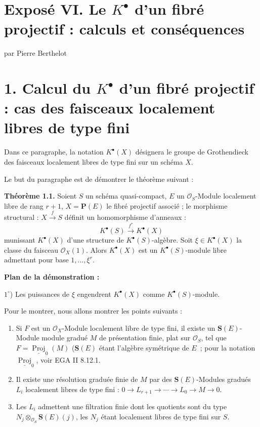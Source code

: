 \section*{Exposé VI. Le \(K^{\bullet}\) d'un fibré projectif : calculs et conséquences}
\renewcommand{\Sym}{\mathbf{S}}
\renewcommand{\Projz}{\underline{\operatorname{Proj}}_0}
\begin{center}
par Pierre Berthelot
\end{center}

\section*{1. Calcul du \(K^{\bullet}\) d'un fibré projectif : cas des faisceaux localement libres de type fini}

Dans ce paragraphe, la notation \(K^{\bullet}(X)\) désignera le groupe de Grothendieck des faisceaux localement libres de type fini sur un schéma \(X\).

Le but du paragraphe est de démontrer le théorème suivant :

\textbf{Théorème 1.1.} Soient \(S\) un schéma quasi-compact, \(E\) un \(\mathcal O_S\)-Module localement libre de rang \(r+1\), \(X=\mathbf P(E)\) le fibré projectif associé ; le morphisme structural : \(X\xrightarrow{f}S\) définit un homomorphisme d'anneaux :
\[
  K^{\bullet}(S) \xrightarrow{f^*} K^{\bullet}(X)
\]
munissant \(K^{\bullet}(X)\) d'une structure de \(K^{\bullet}(S)\)-algèbre. Soit \(\xi\in K^{\bullet}(X)\) la classe du faisceau \(\mathcal O_X(1)\). Alors \(K^{\bullet}(X)\) est un \(K^{\bullet}(S)\)-module libre admettant pour base \(1,\ldots,\xi^r\).

\textbf{Plan de la démonstration :}

\(1^\circ\)) Les puissances de \(\xi\) engendrent \(K^{\bullet}(X)\) comme \(K^{\bullet}(S)\)-module.

Pour le montrer, nous allons montrer les points suivants :

\begin{enumerate}[label=\alph*)]
\item Si \(F\) est un \(\mathcal O_X\)-Module localement libre de type fini, il existe un \(\Sym(E)\)-Module module gradué \(M\) de présentation finie, plat sur \(\mathcal O_S\), tel que \(F=\Projz(M)\) (\(\Sym(E)\) étant l'algèbre symétrique de \(E\)~; pour la notation \(\Projz\), voir EGA II 8.12.1.

\item Il existe une résolution graduée finie de \(M\) par des \(\Sym(E)\)-Modules gradués \(L_i\) localement libres de type fini : \(0\longrightarrow L_{r+1}\longrightarrow\cdots\longrightarrow L_0\longrightarrow M\longrightarrow 0\).

\item Les \(L_i\) admettent une filtration finie dont les quotients sont du type \(N_j\otimes_{\mathcal O_S}\Sym(E)(j)\), les \(N_j\) étant localement libres de type fini sur \(S\).
\end{enumerate}


